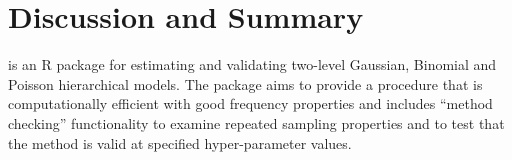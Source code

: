\documentclass[article]{jss}
\begin{document}




\section[Discussion]{Discussion and Summary} \label{discussion}
 is an R package for estimating and validating two-level Gaussian, Binomial and Poisson hierarchical models. The package aims to provide a procedure that is computationally efficient with good frequency properties and includes ``method checking'' functionality to examine repeated sampling properties and to test that the method is valid at specified hyper-parameter values.
\end{document}
